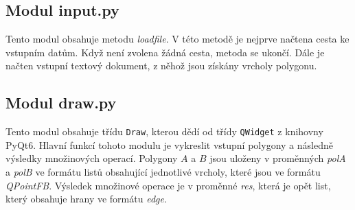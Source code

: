 \documentclass{article}
\begin{document}
\subsection{\small{Modul input.py}}
Tento modul obsahuje metodu \emph{loadfile}. V této metodě je nejprve načtena cesta ke vstupním datům. Když není zvolena žádná cesta, metoda se ukončí. Dále je načten vstupní textový dokument, z něhož jsou získány vrcholy polygonu.
\subsection{\small{Modul draw.py}}
Tento modul obsahuje třídu \texttt{Draw}, kterou dědí od třídy \texttt{QWidget} z knihovny PyQt6. Hlavní funkcí tohoto modulu je vykreslit vstupní polygony a následně výsledky množinových operací. Polygony $A$ a $B$ jsou uloženy v proměnných \emph{polA} a \emph{polB} ve formátu listů obsahující jednotlivé vrcholy, které jsou ve formátu \emph{QPointFB}. Výsledek množinové operace je v proměnné \emph{res}, která je opět list, který obsahuje hrany ve formátu \emph{edge}.
\end{document}
